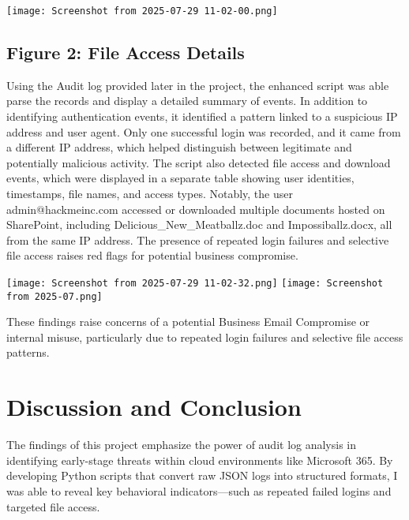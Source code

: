 \documentclass[12pt]{article}
\begin{document}
\begin{center}
\texttt{[image: Screenshot from 2025-07-29 11-02-00.png]}
\end{center}

\subsection*{Figure 2: File Access Details}
Using the Audit log provided later in the project, the enhanced script was able parse the records and display a detailed summary of events. In addition to identifying authentication events, it identified a pattern linked to a suspicious IP address and user agent. Only one successful login was recorded, and it came from a different IP address, which helped distinguish between legitimate and potentially malicious activity. The script also detected file access and download events, which were displayed in a separate table showing user identities, timestamps, file names, and access types. Notably, the user admin@hackmeinc.com accessed or downloaded multiple documents hosted on SharePoint, including Delicious\_New\_Meatballz.doc and Impossiballz.docx, all from the same IP address. The presence of repeated login failures and selective file access raises red flags for potential business compromise. 


\begin{center}
\texttt{[image: Screenshot from 2025-07-29 11-02-32.png]}
\texttt{[image: Screenshot from 2025-07.png]}
\end{center}

These findings raise concerns of a potential Business Email Compromise or internal misuse, particularly due to repeated login failures and selective file access patterns.

\section{Discussion and Conclusion}

The findings of this project emphasize the power of audit log analysis in identifying early-stage threats within cloud environments like Microsoft 365. By developing Python scripts that convert raw JSON logs into structured formats, I was able to reveal key behavioral indicators—such as repeated failed logins and targeted file access.
\end{document}
